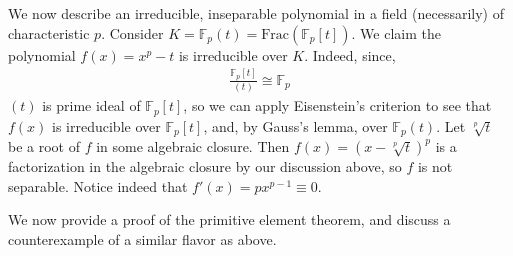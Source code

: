\documentclass[12pt]{article}
\theoremstyle{definitionstyle}
\def\mbb#1{\mathbb{#1}}
\newcommand{\F}{\mbb F}
\begin{document}
	We now describe an irreducible, inseparable polynomial in a field (necessarily) of characteristic $p$. Consider $K = \F_p(t) = \mathrm{Frac}(\F_p[t])$. We claim the polynomial $f(x) = x^p - t$ is irreducible over $K$. Indeed, since,
	\begin{align*}
		\frac{\F_p[t]}{(t)} \cong \F_p
	\end{align*}
	$(t)$ is prime ideal of $\F_p[t]$, so we can apply Eisenstein's criterion to see that $f(x)$ is irreducible over $\F_p[t]$, and, by Gauss's lemma, over $\F_p(t)$. Let $\sqrt[p]{t}$ be a root of $f$ in some algebraic closure. Then $f(x) = (x-\sqrt[p]{t})^p$ is a factorization in the algebraic closure by our discussion above, so $f$ is not separable. Notice indeed that $f'(x) = px^{p-1} \equiv 0$. 
	
	We now provide a proof of the primitive element theorem, and discuss a counterexample of a similar flavor as above.
	
\end{document}
